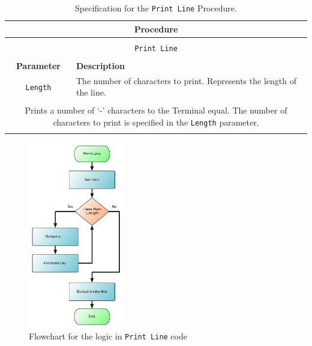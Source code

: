 \begin{table}[h]
  \centering
  \begin{tabular}{|c|p{9cm}|}
    \hline
    \multicolumn{2}{|c|}{\textbf{Procedure}} \\
    \hline
    \multicolumn{2}{|c|}{} \\
    \multicolumn{2}{|c|}{\texttt{Print Line}} \\
    \multicolumn{2}{|c|}{} \\
    \hline
    \textbf{Parameter} & \textbf{Description} \\
    \hline
    \texttt{Length} & The number of characters to print. Represents the length of the line. \\
    \hline
    \multicolumn{2}{|c|}{} \\
    \multicolumn{2}{|p{12cm}|}{Prints a number of `-' characters to the Terminal equal. The number of characters to print is specified in the \texttt{Length} parameter.} \\
    \multicolumn{2}{|c|}{} \\
    \hline
  \end{tabular}
  \caption{Specification for the \texttt{Print Line} Procedure.}
  \label{tbl:print line}
\end{table}

\begin{figure}[htbp]
   \centering
   \includegraphics[width=0.37\textwidth]{./topics/control-flow/diagrams/PrintLine} 
   \caption{Flowchart for the logic in \texttt{Print Line} code}
   \label{fig:print-line}
\end{figure}

\clearpage

